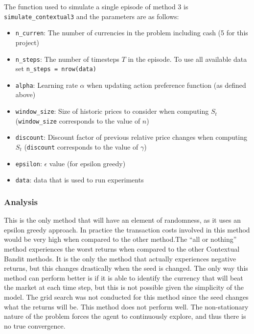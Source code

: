 \documentclass[a4paper,12pt]{article}
\newcommand{\code}[1]{\texttt{#1}}
\begin{document}
The function used to simulate a single episode of method 3 is \code{simulate\_contextual3} and the parameters are as follows:
\begin{itemize}
  \item \code{n\_curren}: The number of currencies in the problem including cash (5 for this project)
  \item \code{n\_steps}: The number of timesteps $T$ in the episode. To use all available data set \code{n\_steps = nrow(data)}
  \item \code{alpha}: Learning rate $\alpha$ when updating action preference function (as defined above)
  \item \code{window\_size}: Size of historic prices to consider when computing $S_t$ (\code{window\_size} corresponds to the value of $n$)
  \item \code{discount}: Discount factor of previous relative price changes when computing $S_t$ (\code{discount} corresponds to the value of $\gamma$)
  \item \code{epsilon}: $\epsilon$ value (for epsilon greedy)
  \item \code{data}: data that is used to run experiments
\end{itemize}

\newpage

\subsubsection{Analysis}
This is the only method that will have an element of randomness, as it uses an epsilon greedy approach. In practice the transaction costs involved in this method would be very high when compared to the other method.The “all or nothing” method  experiences the worst returns when compared to the other Contextual Bandit methods. It is the only the method that actually experiences negative returns, but this changes drastically when the seed is changed. The only way this method can perform better is if it is able to identify the currency that will beat the market at each time step, but this is not possible given the simplicity of the model.
The grid search was not conducted for this method since the seed changes what the returns will be. 
This method does not perform well. The non-stationary nature of the problem forces the agent to continuously explore, and thus there is no true convergence. 
\end{document}
